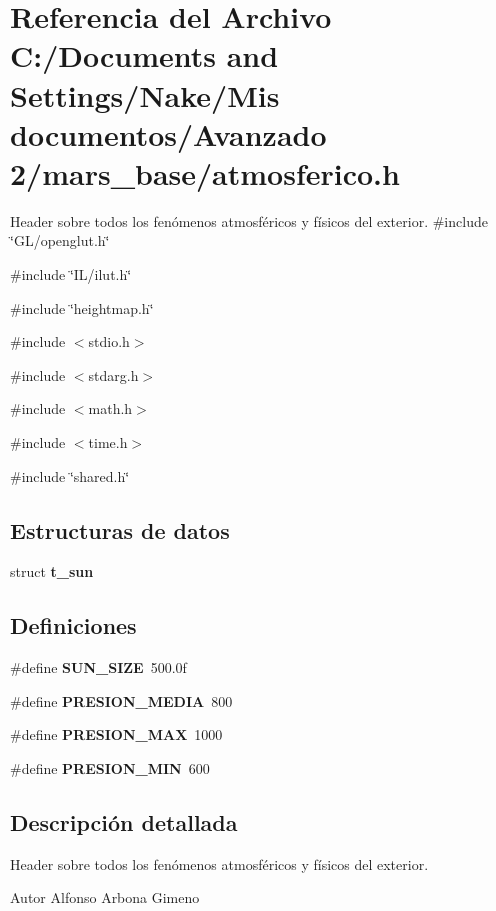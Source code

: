 \section{Referencia del Archivo C:/Documents and Settings/Nake/Mis documentos/Avanzado 2/mars\_\-base/atmosferico.h}
\label{atmosferico_8h}


Header sobre todos los fenómenos atmosféricos y físicos del exterior.  
{\ttfamily \#include \char`\"{}GL/openglut.h\char`\"{}}\par
{\ttfamily \#include \char`\"{}IL/ilut.h\char`\"{}}\par
{\ttfamily \#include \char`\"{}heightmap.h\char`\"{}}\par
{\ttfamily \#include $<$stdio.h$>$}\par
{\ttfamily \#include $<$stdarg.h$>$}\par
{\ttfamily \#include $<$math.h$>$}\par
{\ttfamily \#include $<$time.h$>$}\par
{\ttfamily \#include \char`\"{}shared.h\char`\"{}}\par
\subsection*{Estructuras de datos}
\begin{DoxyCompactItemize}
\item 
struct {\bf t\_\-sun}
\end{DoxyCompactItemize}
\subsection*{Definiciones}
\begin{DoxyCompactItemize}
\item 
\#define {\bfseries SUN\_\-SIZE}~500.0f\label{atmosferico_8h_a9a4efb5e578b47c170d4b920cf7b475b}

\item 
\#define {\bfseries PRESION\_\-MEDIA}~800\label{atmosferico_8h_a80b47b9e532443dfec1c5a4098bf6460}

\item 
\#define {\bfseries PRESION\_\-MAX}~1000\label{atmosferico_8h_a478eb09f11dae51a6b1bc222c60d575b}

\item 
\#define {\bfseries PRESION\_\-MIN}~600\label{atmosferico_8h_af932812b2d7f06ea270b624272e4a496}

\end{DoxyCompactItemize}


\subsection{Descripción detallada}
Header sobre todos los fenómenos atmosféricos y físicos del exterior. \begin{DoxyAuthor}{Autor}
Alfonso Arbona Gimeno 
\end{DoxyAuthor}
